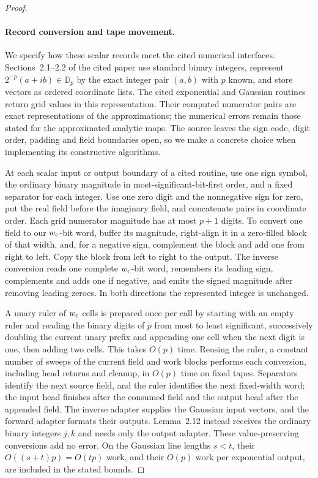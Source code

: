 \begin{proof}
\paragraph{Record conversion and tape movement.}
We specify how these scalar records meet the cited numerical interfaces.
Sections~2.1--2.2 of the cited paper use standard binary integers, represent
$2^{-p}(a+ib)\in\mathbb D_p$ by the exact integer pair $(a,b)$ with $p$
known, and store vectors as ordered coordinate lists. The cited
exponential and Gaussian routines return grid values in this
representation. Their computed numerator pairs are exact representations
of the approximations; the numerical errors remain those stated for the
approximated analytic maps. The source leaves the sign code, digit order,
padding and field boundaries open, so we make a concrete choice when
implementing its constructive algorithms.

At each scalar input or output boundary of a cited routine, use one sign
symbol, the ordinary binary magnitude in most-significant-bit-first order,
and a fixed separator for
each integer. Use one zero digit and the nonnegative sign for zero, put
the real field before the imaginary field, and concatenate pairs in
coordinate order. Each grid numerator magnitude has at most $p+1$ digits.
To convert one field to our $w_{\rm c}$-bit word, buffer its magnitude, right-align
it in a zero-filled block of that width, and, for a negative sign,
complement the block and add one from right to left. Copy the block from
left to right to the output. The inverse conversion reads one complete
$w_{\rm c}$-bit word, remembers its leading sign, complements and adds
one if negative, and emits the signed magnitude after removing leading
zeroes. In both directions the represented integer is unchanged.

A unary ruler of $w_{\rm c}$ cells is prepared once per call by starting
with an empty ruler and reading the binary digits of $p$ from most to least
significant, successively doubling the current unary prefix
and appending one cell when the next digit is one, then adding two cells.
This takes $O(p)$ time. Reusing the ruler, a constant
number of sweeps of the current field and work blocks performs each
conversion, including head returns and cleanup, in $O(p)$ time on fixed
tapes. Separators identify the next source field, and the ruler identifies
the next fixed-width word; the input head finishes after the consumed
field and the output head after the appended field. The inverse adapter
supplies the Gaussian input vectors, and the forward adapter formats their
outputs. Lemma~2.12 instead receives the ordinary binary integers $j,k$
and needs only the output adapter. These value-preserving conversions add
no error. On the Gaussian line lengths $s<t$, their
$O((s+t)p)=O(tp)$ work, and their $O(p)$ work per exponential output,
are included in the stated bounds.


\end{proof}
